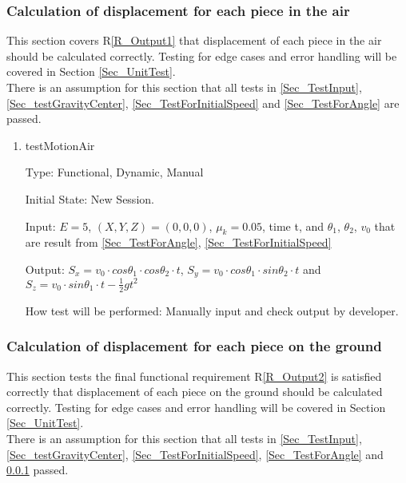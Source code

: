 \documentclass[12pt, titlepage]{article}
\newcommand{\rref}[1]{R\ref{#1}}
\begin{document}
\subsubsection{Calculation of displacement for each piece in the air}
\label{Sec_TestMotionAir}

This section covers \rref{R_Output1} that displacement of each piece in the air should be calculated correctly. Testing for edge cases and error handling will be covered in Section \ref{Sec_UnitTest}.\\ 
There is an assumption for this section that all tests in \ref{Sec_TestInput}, \ref{Sec_testGravityCenter}, \ref{Sec_TestForInitialSpeed} and \ref{Sec_TestForAngle} are passed.
\begin{enumerate}

\item{testMotionAir\\}

Type: Functional, Dynamic, Manual

Initial State: New Session.

Input: $E = 5$, $(X,Y,Z) = (0,0,0)$, $\mu_{k} = 0.05$, time t, and $\theta_{1}$, $\theta_{2}$, $v_{0}$ that are result from \ref{Sec_TestForAngle}, \ref{Sec_TestForInitialSpeed}

Output: $S_{x}=v_{0}\cdot cos\theta _{1}\cdot cos\theta _{2}\cdot t$, $S_{y}=v_{0}\cdot cos\theta _{1}\cdot sin\theta _{2}\cdot t$ and $S_{z}=v_{0}\cdot sin\theta _{1}\cdot t-\frac{1}{2}gt^{2}$

How test will be performed: Manually input and check output by developer.

\end{enumerate}

\subsubsection{Calculation of displacement for each piece on the ground}

This section tests the final functional requirement \rref{R_Output2} is satisfied correctly that displacement of each piece on the ground should be calculated correctly. Testing for edge cases and error handling will be covered in Section \ref{Sec_UnitTest}.\\
There is an assumption for this section that all tests in \ref{Sec_TestInput}, \ref{Sec_testGravityCenter}, \ref{Sec_TestForInitialSpeed}, \ref{Sec_TestForAngle} and \ref{Sec_TestMotionAir} passed.
\end{document}
